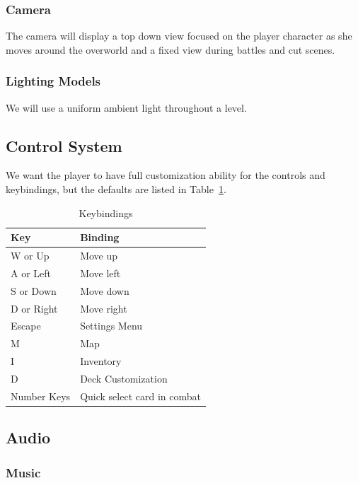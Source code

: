 \documentclass[12pt,titlepage]{article}
\begin{document}
\subsubsection{Camera}

The camera will display a top down view focused on the player character as she
moves around the overworld and a fixed view during battles and cut scenes.

\subsubsection{Lighting Models}

We will use a uniform ambient light throughout a level.

\subsection{Control System}

We want the player to have full customization ability for the controls and
keybindings, but the defaults are listed in Table~\ref{tab:keybindings}.

\begin{table}[H]
    \caption{Keybindings}
    \label{tab:keybindings}
    \centering
    \begin{tabular}{|l|l|}
        \hline
        \textbf{Key} & \textbf{Binding} \\
        \hline\hline
        W or Up & Move up \\
        A or Left & Move left \\
        S or Down &  Move down \\
        D or Right & Move right \\
        Escape & Settings Menu \\
        M & Map \\
        I & Inventory \\
        D & Deck Customization \\
        Number Keys & Quick select card in combat \\
        \hline
    \end{tabular}
\end{table}

\subsection{Audio}

\subsubsection{Music}
\end{document}
